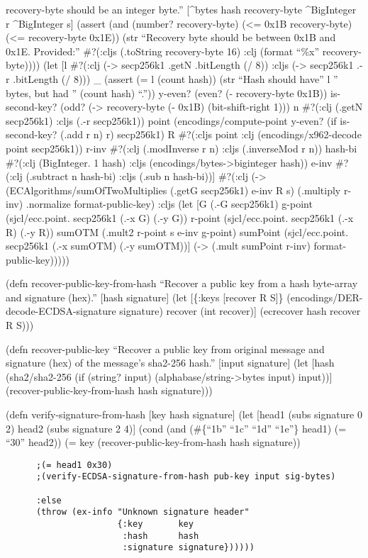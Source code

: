 \documentclass[
]{article}
\begin{document}
recovery-byte should be an integer byte.'' {[}\^{}bytes hash
recovery-byte \^{}BigInteger r \^{}BigInteger s{]} (assert (and (number?
recovery-byte) (\textless= 0x1B recovery-byte) (\textless= recovery-byte
0x1E)) (str ``Recovery byte should be between 0x1B and 0x1E. Provided:''
\#?(:cljs (.toString recovery-byte 16) :clj (format ``\%x''
recovery-byte)))) (let {[}l \#?(:clj (-\textgreater{} secp256k1 .getN
.bitLength (/ 8)) :cljs (-\textgreater{} secp256k1 .-r .bitLength (/
8))) \_ (assert (= l (count hash)) (str ``Hash should have'' l '' bytes,
but had '' (count hash) ``.'')) y-even? (even? (- recovery-byte 0x1B))
is-second-key? (odd? (-\textgreater{} recovery-byte (- 0x1B)
(bit-shift-right 1))) n \#?(:clj (.getN secp256k1) :cljs (.-r
secp256k1)) point (encodings/compute-point y-even? (if is-second-key?
(.add r n) r) secp256k1) R \#?(:cljs point :clj (encodings/x962-decode
point secp256k1)) r-inv \#?(:clj (.modInverse r n) :cljs (.inverseMod r
n)) hash-bi \#?(:clj (BigInteger. 1 hash) :cljs
(encodings/bytes-\textgreater biginteger hash)) e-inv \#?(:clj
(.subtract n hash-bi) :cljs (.sub n hash-bi)){]} \#?(:clj
(-\textgreater{} (ECAlgorithms/sumOfTwoMultiplies (.getG secp256k1)
e-inv R s) (.multiply r-inv) .normalize format-public-key) :cljs (let
{[}G (.-G secp256k1) g-point (sjcl/ecc.point. secp256k1 (.-x G) (.-y G))
r-point (sjcl/ecc.point. secp256k1 (.-x R) (.-y R)) sumOTM (.mult2
r-point s e-inv g-point) sumPoint (sjcl/ecc.point. secp256k1 (.-x
sumOTM) (.-y sumOTM)){]} (-\textgreater{} (.mult sumPoint r-inv)
format-public-key)))))

(defn recover-public-key-from-hash ``Recover a public key from a hash
byte-array and signature (hex).'' {[}hash signature{]} (let {[}\{:keys
{[}recover R S{]}\} (encodings/DER-decode-ECDSA-signature signature)
recover (int recover){]} (ecrecover hash recover R S)))

(defn recover-public-key ``Recover a public key from original message
and signature (hex) of the message's sha2-256 hash.'' {[}input
signature{]} (let {[}hash (sha2/sha2-256 (if (string? input)
(alphabase/string-\textgreater bytes input) input)){]}
(recover-public-key-from-hash hash signature)))

(defn verify-signature-from-hash {[}key hash signature{]} (let {[}head1
(subs signature 0 2) head2 (subs signature 2 4){]} (cond (and
(\#\{``1b'' ``1c'' ``1d'' ``1e''\} head1) (= ``30'' head2)) (= key
(recover-public-key-from-hash hash signature))

\begin{verbatim}
      ;(= head1 0x30) 
      ;(verify-ECDSA-signature-from-hash pub-key input sig-bytes) 

      :else 
      (throw (ex-info "Unknown signature header" 
                      {:key       key 
                       :hash      hash 
                       :signature signature}))))) 
\end{verbatim}
\end{document}
